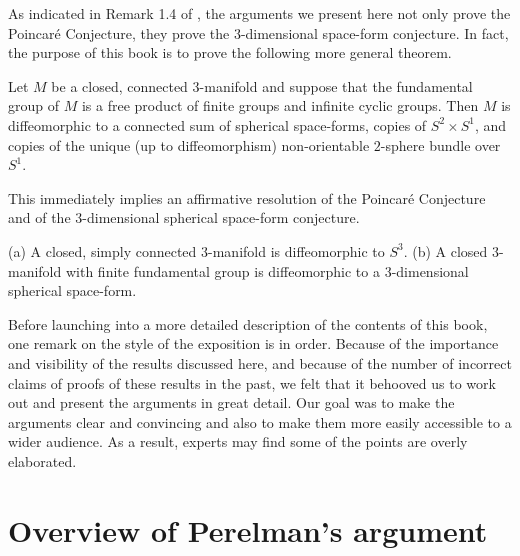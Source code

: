  As indicated in Remark 1.4 of \cite{Perelman3},  the arguments we present
 here not only prove the Poincar\'e Conjecture, they prove the $3$-dimensional space-form conjecture.
 In fact,  the purpose of this book is to prove the following
 more general theorem.

\begin{theorem}
\label{thm:classification-fundamental-group-free-product}\label{Theorem1} Let $M$ be a closed, connected $3$-manifold and
suppose that the fundamental group of $M$ is a free product of
finite groups and infinite cyclic groups. Then $M$ is diffeomorphic
to a connected sum of spherical space-forms, copies of $S^2\times
S^1$, and copies of the unique (up to diffeomorphism) non-orientable
$2$-sphere bundle over $S^1$.
\end{theorem}

This immediately implies an affirmative resolution of the Poincar\'e
Conjecture and of the $3$-dimensional spherical space-form
conjecture.

\begin{corollary}
\label{cor:poincare-and-spherical-space-form}
(a) A closed, simply connected $3$-manifold is diffeomorphic to
$S^3$. (b) A closed  $3$-manifold with finite fundamental
group is diffeomorphic to a $3$-dimensional spherical space-form.
\end{corollary}

Before launching into a more detailed description of the contents of
this book, one remark on the style of the exposition is in order.
Because of the importance and visibility of the results discussed
here, and because of the number of incorrect claims of proofs of
these results in the past, we felt that it behooved us to work out
and present the arguments in great detail. Our goal was to make the
arguments clear and convincing and also to make them more easily
accessible to a wider audience. As a result, experts may find some
of the points are overly elaborated.



\section{Overview of Perelman's argument}


